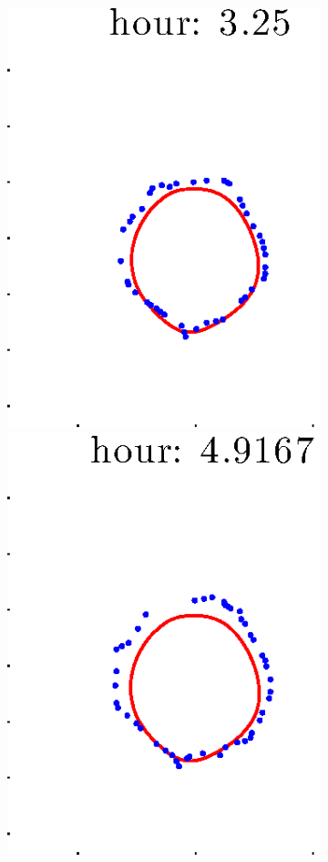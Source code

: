 \documentclass[12pt]{article}
\begin{document}
\begin{figure}[h!]
\begin{subfigure}[b]{.3\textwidth}
		\includegraphics[height=.15\textheight]{Pos14exp8/full/second3.eps}
		\includegraphics[height=.15\textheight]{Pos14exp8/full/second4.eps}

\end{subfigure}
\end{figure}
\end{document}
